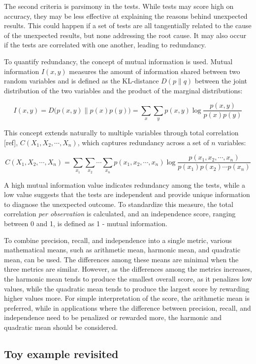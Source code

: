 \documentclass[
  12pt,
]{interact}
\begin{document}
The second criteria is parsimony in the tests. While tests may score
high on accuracy, they may be less effective at explaining the reasons
behind unexpected results. This could happen if a set of tests are all
tangentially related to the cause of the unexpected results, but none
addressing the root cause. It may also occur if the tests are correlated
with one another, leading to redundancy.

To quantify redundancy, the concept of mutual information is used.
Mutual information \(I(x, y)\) measures the amount of information shared
between two random variables and is defined as the KL-distance
\(D(p \parallel q)\) between the joint distribution of the two variables
and the product of the marginal distributions:

\[I(x,y) = D\big(p(x,y) \parallel p(x)p(y)\big) = \sum_x \sum_y p(x,y) \log \frac{p(x,y)}{p(x)p(y)}\]

This concept extends naturally to multiple variables through total
correlation {[}ref{]}, \(C(X_1, X_2, \cdots, X_n)\), which captures
redundancy across a set of \(n\) variables:

\[C(X_1, X_2, \cdots, X_n) = \sum_{x_1} \sum_{x_2} \cdots \sum_{x_n} p(x_1, x_2, \cdots, x_n) \log \frac{p(x_1, x_2, \cdots, x_n)}{p(x_1)p(x_2) \cdots p(x_n)}\]

A high mutual information value indicates redundancy among the tests,
while a low value suggests that the tests are independent and provide
unique information to diagnose the unexpected outcome. To standardize
this measure, the total correlation \emph{per observation} is
calculated, and an independence score, ranging between 0 and 1, is
defined as 1 - mutual information.

To combine precision, recall, and independence into a single metric,
various mathematical means, such as arithmetic mean, harmonic mean, and
quadratic mean, can be used. The differences among these means are
minimal when the three metrics are similar. However, as the differences
among the metrics increases, the harmonic mean tends to produce the
smallest overall score, as it penalizes low values, while the quadratic
mean tends to produce the largest score by rewarding higher values more.
For simple interpretation of the score, the arithmetic mean is
preferred, while in applications where the difference between precision,
recall, and independence need to be penalized or rewarded more, the
harmonic and quadratic mean should be considered.

\subsection{Toy example revisited}\label{toy-example-revisited}
\end{document}
